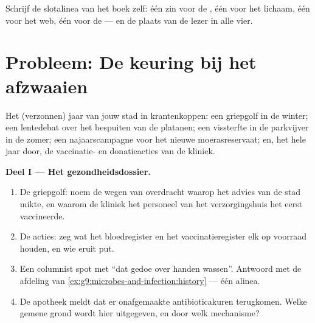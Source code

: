 \begin{exercise}[$\star\star\star$]\label{exo:g9:our-responsibility:12}
Schrijf de slotalinea van het boek zelf: één zin voor de , één
voor het lichaam, één voor het web, één voor de  --- en de
plaats van de lezer in alle vier.
\end{exercise}

\section{Probleem: De keuring bij het afzwaaien}

\begin{problem}\label{pb:g9:our-responsibility:1}
Het (verzonnen) jaar van jouw stad in krantenkoppen: een griepgolf
in de winter; een lentedebat over het bespuiten van de platanen;
een vissterfte in de parkvijver in de zomer; een najaarscampagne
voor het nieuwe moerasreservaat; en, het hele jaar door, de
vaccinatie- en donatieacties van de kliniek.

\medskip\noindent\textbf{Deel I --- Het gezondheidsdossier.}
\begin{enumerate}
  \item De griepgolf: noem de wegen van overdracht waarop het
        advies van de stad mikte, en waarom de kliniek het
        personeel van het verzorgingshuis het eerst vaccineerde.
  \item De acties: zeg wat het bloedregister en het
        vaccinatieregister elk op voorraad houden, en wie
        eruit put.
  \item Een columnist spot met ``dat gedoe over handen wassen''.
        Antwoord met de afdeling van
        \cref{ex:g9:microbes-and-infection:history} ---
        één alinea.
  \item De apotheek meldt dat er onafgemaakte antibioticakuren
        terugkomen. Welke gemene grond wordt hier uitgegeven, en
        door welk mechanisme?
\end{enumerate}


\end{problem}
